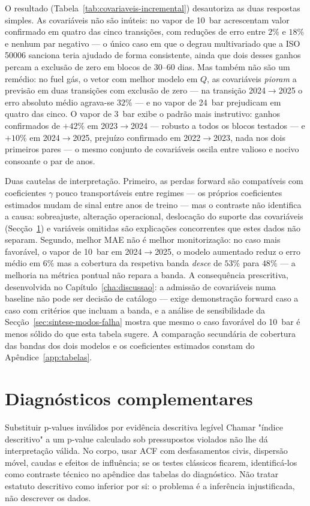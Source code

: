 O resultado (Tabela~\ref{tab:covariaveis-incremental}) desautoriza as duas respostas
simples. As covariáveis não são inúteis: no vapor de 10~bar acrescentam valor
confirmado em quatro das cinco transições, com reduções de erro entre $2\%$ e
$18\%$ e nenhum par negativo --- o único caso em que o degrau multivariado
que a ISO 50006 sanciona teria ajudado de forma consistente, ainda que dois
desses ganhos percam a exclusão de zero em blocos de 30--60 dias. Mas também
não são um remédio: no fuel gás, o vetor com melhor modelo em $Q$, as
covariáveis \emph{pioram} a previsão em duas transições com exclusão de zero
--- na transição 2024${\to}$2025 o erro absoluto médio agrava-se $32\%$ --- e
no vapor de 24~bar prejudicam em quatro das cinco. O vapor de 3~bar exibe o
padrão mais instrutivo: ganhos confirmados de $+42\%$ em 2023${\to}$2024 ---
robusto a todos os blocos testados --- e $+10\%$ em 2024${\to}$2025, prejuízo
confirmado em 2022${\to}$2023, nada nos dois primeiros pares --- o mesmo
conjunto de covariáveis oscila entre valioso e nocivo consoante o par de
anos.

Duas cautelas de interpretação. Primeiro, as perdas forward são compatíveis
com coeficientes $\gamma$ pouco transportáveis entre regimes --- os próprios
coeficientes estimados mudam de sinal entre anos de treino --- mas o contraste
não identifica a causa: sobreajuste, alteração operacional, deslocação do
suporte das covariáveis (Secção~\ref{sec:diagnosticos-desc}) e variáveis
omitidas são explicações concorrentes que estes dados não separam. Segundo,
melhor MAE não é melhor monitorização: no caso mais favorável, o vapor de
10~bar em 2024${\to}$2025, o modelo aumentado reduz o erro médio em $6\%$ mas
a cobertura da respetiva banda \emph{desce} de $53\%$ para $48\%$ --- a
melhoria na métrica pontual não repara a banda. A consequência prescritiva,
desenvolvida no Capítulo~\ref{cha:discussao}: a admissão de covariáveis numa
baseline não pode ser decisão de catálogo --- exige demonstração forward caso
a caso com critérios que incluam a banda, e a análise de sensibilidade da
Secção~\ref{sec:sintese-modos-falha} mostra que mesmo o caso favorável do
10~bar é menos sólido do que esta tabela sugere. A comparação secundária de
cobertura das bandas dos dois modelos e os coeficientes estimados constam do
Apêndice~\ref{app:tabelas}.


\section{Diagnósticos complementares}
\label{sec:diagnosticos-desc}
{Substituir p-values inválidos por evidência descritiva legível}
{Chamar "índice descritivo" a um p-value calculado sob pressupostos
violados não lhe dá interpretação válida. No corpo, usar ACF com
desfasamentos civis, dispersão móvel, caudas e efeitos de influência;
se os testes clássicos ficarem, identificá-los como contraste técnico
no apêndice das tabelas do diagnóstico. Não tratar estatuto descritivo como inferior por si:
o problema é a inferência injustificada, não descrever os dados.}%

